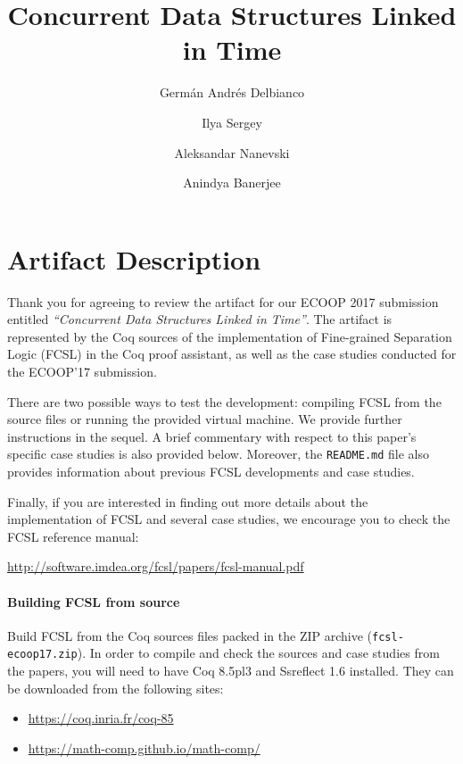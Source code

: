 \documentclass[a4paper,USenglish]{lipics-v2016}
\title{Concurrent Data Structures Linked in Time}
\author{Germ\'{a}n Andr\'{e}s Delbianco}
\author{Ilya Sergey}
\author{Aleksandar Nanevski}
\author{Anindya Banerjee}
\begin{document}
\maketitle
 
\thispagestyle{empty}


\section*{\LARGE{Artifact Description}}
\label{sec:note-reviewers}

Thank you for agreeing to review the artifact for our ECOOP 2017
submission entitled \textit{``Concurrent Data Structures Linked in
  Time''}. The artifact is represented by the Coq sources of the
implementation of Fine-grained Separation Logic (FCSL) in the Coq
proof assistant, as well as the case studies conducted for the
ECOOP'17 submission.

There are two possible ways to test the development: compiling FCSL
from the source files or running the provided virtual machine. We
provide further instructions in the sequel. A brief commentary with
respect to this paper's specific case studies is also provided
below. Moreover, the \texttt{README.md} file also provides information
about previous FCSL developments and case studies.

Finally, if you are interested in finding out more details about the
implementation of FCSL and several case studies, we encourage you to
check the FCSL reference manual:

\begin{centering}
  \url{http://software.imdea.org/fcsl/papers/fcsl-manual.pdf}
\end{centering}

\paragraph*{Building FCSL from source}
Build FCSL from the Coq sources files packed in the ZIP archive
(\texttt{fcsl-ecoop17.zip}). In order to compile and check the sources
and case studies from the papers, you will need to have Coq 8.5pl3 and
Ssreflect 1.6 installed. They can be downloaded from the following
sites:

\begin{itemize}
\item \url{https://coq.inria.fr/coq-85}
\item \url{https://math-comp.github.io/math-comp/}
\end{itemize}
\end{document}
